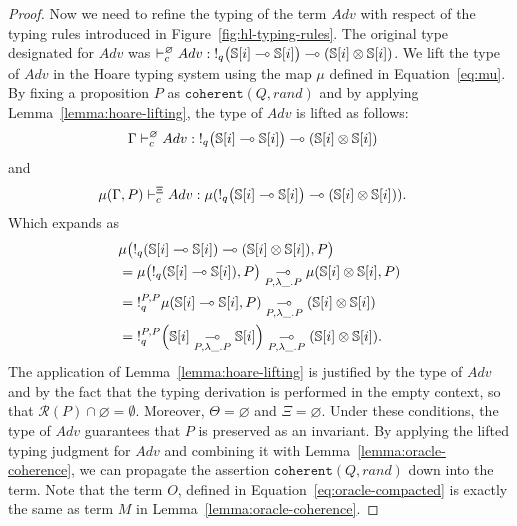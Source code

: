 \begin{proof}
Now we need to refine the typing of the term $Adv$ with respect of the typing rules introduced in Figure~\ref{fig:hl-typing-rules}. The original type designated for $Adv$ was $\vdash_c^\varnothing Adv: \mathord{!}_{q}\bigl(\mathbb{S}[i] \multimap \mathbb{S}[i]\bigr) \multimap (\mathbb{S}[i] \otimes \mathbb{S}[i])$. We lift the type of $Adv$ in the Hoare typing system using the map $\mu$ defined in Equation~\ref{eq:mu}. By fixing a proposition $P$ as $\mathtt{coherent}(Q, rand)$ and by applying Lemma~\ref{lemma:hoare-lifting}, the type of $Adv$ is lifted as follows:
\begin{align*}
&\Gamma \vdash_c^\varnothing Adv: \mathord{!}_{q}\bigl(\mathbb{S}[i] \multimap \mathbb{S}[i]\bigr) \multimap (\mathbb{S}[i] \otimes \mathbb{S}[i])
\end{align*}
and
\begin{align*}
&\mu(\Gamma, P) \vdash^\Xi_{c} Adv: \mu(\mathord{!}_{q}\bigl(\mathbb{S}[i] \multimap \mathbb{S}[i]\bigr) \multimap (\mathbb{S}[i] \otimes \mathbb{S}[i])).
\end{align*}
Which expands as
\begin{align*}
&\mu\bigl(\mathord{!}_{q}(\mathbb{S}[i] \multimap \mathbb{S}[i]) \multimap (\mathbb{S}[i] \otimes \mathbb{S}[i]), P\bigr) \\
&= \mu\bigl(\mathord{!}_{q}(\mathbb{S}[i] \multimap \mathbb{S}[i]), P\bigr) \underset{P, \lambda \_.P}{\multimap} \mu(\mathbb{S}[i] \otimes \mathbb{S}[i], P) \\
&= \mathord{!}_{q}^{P,P} \mu(\mathbb{S}[i] \multimap \mathbb{S}[i], P) \underset{P, \lambda \_.P}{\multimap} (\mathbb{S}[i] \otimes \mathbb{S}[i]) \\
&= \mathord{!}_{q}^{P,P} \Bigl(\mathbb{S}[i] \underset{P, \lambda \_.P}{\multimap} \mathbb{S}[i]\Bigr) \underset{P, \lambda \_.P}{\multimap} (\mathbb{S}[i] \otimes \mathbb{S}[i]).
\end{align*}
The application of Lemma~\ref{lemma:hoare-lifting} is justified by the type of $Adv$ and by the fact that the typing derivation is performed in the empty context, so that $\mathcal{R}(P) \cap \varnothing = \emptyset$. Moreover, $\Theta = \varnothing$ and $\Xi = \varnothing$. Under these conditions, the type of $Adv$ guarantees that $P$ is preserved as an invariant. By applying the lifted typing judgment for $Adv$ and combining it with Lemma~\ref{lemma:oracle-coherence}, we can propagate the assertion $\mathtt{coherent}(Q, rand)$ down into the term. Note that the term $O$, defined in Equation~\ref{eq:oracle-compacted} is exactly the same as term $M$ in Lemma~\ref{lemma:oracle-coherence}.


\end{proof}
